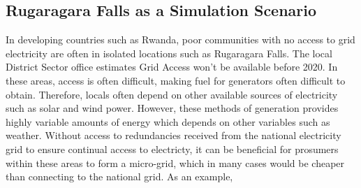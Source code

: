 \subsection*{Rugaragara Falls as a Simulation Scenario}
In developing countries such as Rwanda, poor communities with no access to grid electricity are often in isolated locations such as Rugaragara Falls. The local District Sector office estimates Grid Access won't be available before 2020. In these areas, access is often difficult, making fuel for generators often difficult to obtain. Therefore, locals often depend on other available sources of electricity such as solar and wind power. However, these methods of generation provides highly variable amounts of energy which depends on other variables such as weather. Without access to redundancies received from the national electricity grid to ensure continual access to electricty, it can be beneficial for prosumers within these areas to form a micro-grid, which in many cases would be cheaper than connecting to the national grid. As an example, 



